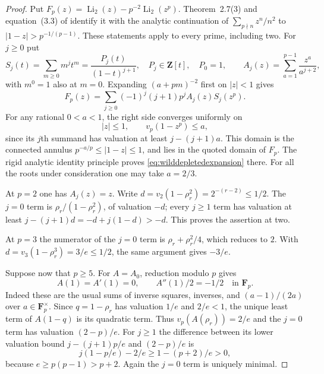 \documentclass[11pt,a4paper]{article}
\theoremstyle{remark}
\newcommand{\Z}{\mathbf Z}
\newcommand{\F}{\mathbf F}
\begin{document}
\begin{proof}
Put $F_p(z)=\operatorname{Li}_2(z)-p^{-2}\operatorname{Li}_2(z^p)$.
Theorem~2.7(3) and equation~(3.3) of
\cite{BesserDeJeuAlgorithm} identify it with the analytic continuation
of $\sum_{p\nmid n}z^n/n^2$ to $|1-z|>p^{-1/(p-1)}$.
These statements apply to every prime, including two.
For $j\geq0$ put
\[
 S_j(t)=\sum_{m\geq0}m^jt^m=\frac{P_j(t)}{(1-t)^{j+1}},
 \quad P_j\in\Z[t],\quad P_0=1,
 \qquad
 A_j(z)=\sum_{a=1}^{p-1}\frac{z^a}{a^{j+2}},
\]
with $m^0=1$ also at $m=0$.
Expanding $(a+pm)^{-2}$ first on $|z|<1$ gives
\begin{equation}\label{eq:wilddepletedexpansion}
 F_p(z)=\sum_{j\geq0}(-1)^j(j+1)p^j A_j(z)S_j(z^p).
\end{equation}
For any rational $0<a<1$, the right side converges uniformly on
\[
 |z|\leq1,\qquad v_p(1-z^p)\leq a,
\]
since its $j$th summand has valuation at least $j-(j+1)a$.
This domain is the connected annulus
$p^{-a/p}\leq|1-z|\leq1$, and lies in the quoted domain of $F_p$.
The rigid analytic identity principle proves
\eqref{eq:wilddepletedexpansion} there. For all the roots under
consideration one may take $a=2/3$.

At $p=2$ one has $A_j(z)=z$. Write
$d=v_2(1-\rho_r^2)=2^{-(r-2)}\leq1/2$.
The $j=0$ term is $\rho_r/(1-\rho_r^2)$, of valuation $-d$;
every $j\geq1$ term has valuation at least
$j-(j+1)d=-d+j(1-d)>-d$. This proves the assertion at two.

At $p=3$ the numerator of the $j=0$ term is
$\rho_r+\rho_r^2/4$, which reduces to $2$.
With $d=v_3(1-\rho_r^3)=3/e\leq1/2$, the same argument gives $-3/e$.

Suppose now that $p\geq5$. For $A=A_0$, reduction modulo $p$ gives
\[
 A(1)=A'(1)=0,\qquad A''(1)/2=-1/2\quad\text{in }\F_p.
\]
Indeed these are the usual sums of inverse squares, inverses,
and $(a-1)/(2a)$ over $a\in\F_p^\times$.
Since $q=1-\rho_r$ has valuation $1/e$ and $2/e<1$,
the unique least term of $A(1-q)$ is its quadratic term.
Thus $v_p(A(\rho_r))=2/e$ and the $j=0$ term has valuation $(2-p)/e$.
For $j\geq1$ the difference between its lower valuation bound
$j-(j+1)p/e$ and $(2-p)/e$ is
\[
 j(1-p/e)-2/e\geq1-(p+2)/e>0,
\]
because $e\geq p(p-1)>p+2$.
Again the $j=0$ term is uniquely minimal.
\end{proof}
\end{document}
